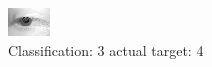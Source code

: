 \begin{figure}[h!]
\begin{center}
\includegraphics[width=0.60\columnwidth]{figures/ID2693_class_3_target_4.png}
\end{center}
\caption{ Classification: 3 actual target: 4}
\label{fig:ID2693_class_3_target_4}
\end{figure}
